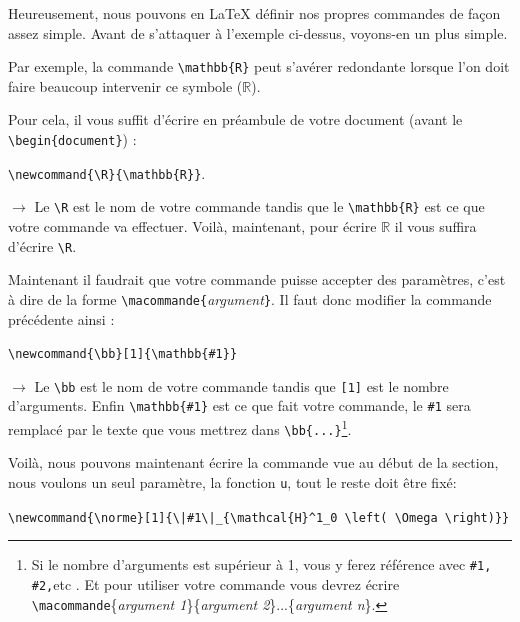 \documentclass[11pt]{article}				%
\newcommand{\tb}{\textbackslash}
\newcommand{\cmdo}[3][]{\texttt{\textbackslash #2}\texttt{[#1}\texttt{]\{#3\}}}
\newcommand{\cmd}[2]{\texttt{\textbackslash #1}\texttt{\{#2\}}}
\newcommand{\cmdi}[2]{\texttt{\textbackslash #1}\texttt{\{}\textit{#2}\texttt{\}}}
\begin{document}
Heureusement, nous pouvons en LaTeX définir nos propres commandes de façon assez simple. Avant de s'attaquer à l'exemple ci-dessus, voyons-en un plus simple.

Par exemple, la commande \cmd{mathbb}{R} peut s'avérer redondante lorsque l'on doit faire beaucoup intervenir ce symbole ($ \mathbb{R} $).

Pour cela, il vous suffit d'écrire en préambule de votre document (avant le \cmd{begin}{document}) : 
\begin{multicols}{2}

\begin{center}
	\cmd{newcommand\{\tb R\}}{\tb mathbb\{R\}}.
\end{center}
 
\columnbreak

$\rightarrow$ Le \verb|\R| est le nom de votre commande tandis que le \cmd{mathbb}{R} est ce que votre commande va effectuer. Voilà, maintenant, pour écrire $ \mathbb{R} $ il vous suffira d'écrire \verb|\R|.\\
\end{multicols}

Maintenant il faudrait que votre commande puisse accepter des paramètres, c'est à dire de la forme \cmdi{macommande}{argument}. Il faut donc modifier la commande précédente ainsi :

\begin{multicols}{2}
	
	\begin{center}
		\cmdo[1]{newcommand\{\tb bb\}}{\tb mathbb\{\#1\}}
	\end{center}
	
	\columnbreak
	
	$\rightarrow$ Le \verb|\bb| est le nom de votre commande tandis que \verb|[1]| est le nombre d'arguments. Enfin \cmd{mathbb}{\#1} est ce que fait votre commande, le \verb|#1| sera remplacé par le texte que vous mettrez dans \verb|\bb{...}|\footnote{Si le nombre d'arguments est supérieur à 1, vous y ferez référence avec \texttt{\#1, \#2,}etc . Et pour utiliser votre commande vous devrez écrire \texttt{\tb macommande}\{\textit{argument 1}\}\{\textit{argument 2}\}...\{\textit{argument n}\}.}.
\end{multicols}

Voilà, nous pouvons maintenant écrire la commande vue au début de la section, nous voulons un seul paramètre, la fonction \texttt{u}, tout le reste doit être fixé:
\newcommand{\norme}[1]{\|#1\|_{\mathcal{H}^1_0\left(\Omega\right)}}
\begin{center}
	\cmdo[1]{newcommand\{\tb norme\}}{\tb |\#1\tb|{\_}\{\cmd{mathcal}{H}\textasciicircum 1\_0 \tb left( \tb Omega \tb right)\}} \\
\end{center}
\end{document}
